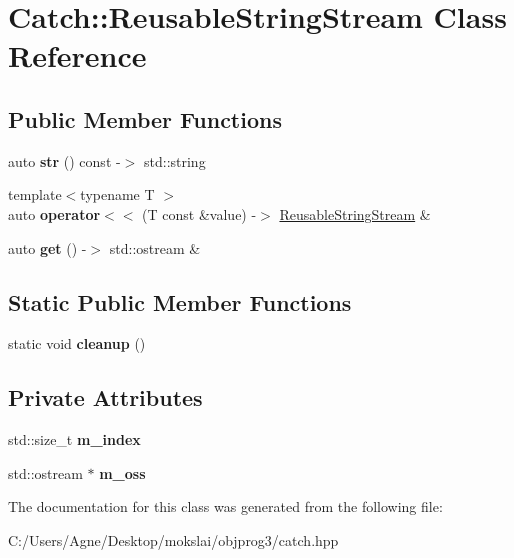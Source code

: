 \hypertarget{class_catch_1_1_reusable_string_stream}{}\section{Catch\+:\+:Reusable\+String\+Stream Class Reference}
\label{class_catch_1_1_reusable_string_stream}
\subsection*{Public Member Functions}
\begin{DoxyCompactItemize}
\item 
\mbox{\label{class_catch_1_1_reusable_string_stream_a0e9ecf260b2a5d35f4886ef0d51f6270}} 
auto {\bfseries str} () const -\/$>$ std\+::string
\item 
\mbox{\label{class_catch_1_1_reusable_string_stream_af95f72024c082db70e5e50782e28e4f6}} 
{\footnotesize template$<$typename T $>$ }\\auto {\bfseries operator$<$$<$} (T const \&value) -\/$>$ \mbox{\hyperlink{class_catch_1_1_reusable_string_stream}{Reusable\+String\+Stream}} \&
\item 
\mbox{\label{class_catch_1_1_reusable_string_stream_a6881808c60a080d4e24a0b81c94cbf67}} 
auto {\bfseries get} () -\/$>$ std\+::ostream \&
\end{DoxyCompactItemize}
\subsection*{Static Public Member Functions}
\begin{DoxyCompactItemize}
\item 
\mbox{\label{class_catch_1_1_reusable_string_stream_a4c320cf5ece009ed23c55b1fa9afccde}} 
static void {\bfseries cleanup} ()
\end{DoxyCompactItemize}
\subsection*{Private Attributes}
\begin{DoxyCompactItemize}
\item 
\mbox{\label{class_catch_1_1_reusable_string_stream_a6e8154ffe67117de424c491e3b192504}} 
std\+::size\+\_\+t {\bfseries m\+\_\+index}
\item 
\mbox{\label{class_catch_1_1_reusable_string_stream_ae8dc0aa8ab418990869cd5ea9ee51f14}} 
std\+::ostream $\ast$ {\bfseries m\+\_\+oss}
\end{DoxyCompactItemize}


The documentation for this class was generated from the following file\+:\begin{DoxyCompactItemize}
\item 
C\+:/\+Users/\+Agne/\+Desktop/mokslai/objprog3/catch.\+hpp\end{DoxyCompactItemize}
